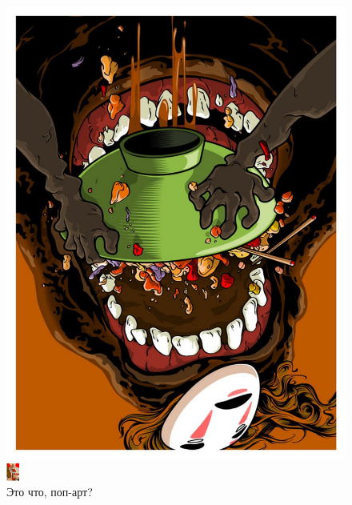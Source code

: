 \documentclass[12pt, a4paper]{article}
\begin{document}
\begin{figure}[H]
\begin{minipage}[H]{0.32\linewidth}
\end{minipage}\hfill
\begin{minipage}[H]{0.32\linewidth} 
\center \includegraphics[width= 3.3 cm, angle = 180 ]{pop6.pdf}
\end{minipage}\hfill
\begin{minipage}[H]{0.32\linewidth} 
 \center \includegraphics[width= 3.1 cm]{pop3.pdf}
\end{minipage}
\caption {Это что, поп-арт?}
\end{figure}
\end{document}

